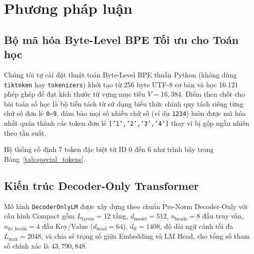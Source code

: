 \section{Phương pháp luận}

\subsection{Bộ mã hóa Byte-Level BPE Tối ưu cho Toán học}
Chúng tôi tự cài đặt thuật toán Byte-Level BPE thuần Python (không dùng \texttt{tiktoken} hay \texttt{tokenizers}) khởi tạo từ 256 byte UTF-8 cơ bản và học 16.121 phép ghép để đạt kích thước từ vựng mục tiêu $V = 16{,}384$. Điểm then chốt cho bài toán số học là bộ tiền tách từ sử dụng biểu thức chính quy tách riêng từng chữ số đơn lẻ \texttt{0--9}, đảm bảo mọi số nhiều chữ số (ví dụ \texttt{1234}) luôn được mã hóa nhất quán thành các token đơn lẻ \texttt{['1','2','3','4']} thay vì bị gộp ngẫu nhiên theo tần suất.

Hệ thống cố định 7 token đặc biệt từ ID 0 đến 6 như trình bày trong Bảng~\ref{tab:special_tokens}.

\begin{table}[htbp]
\centering
\caption{Danh sách 7 Token Đặc biệt Cố định}
\label{tab:special_tokens}
\end{table}

\subsection{Kiến trúc Decoder-Only Transformer}
Mô hình \texttt{DecoderOnlyLM} được xây dựng theo chuẩn Pre-Norm Decoder-Only \cite{touvron2023llama} với cấu hình Compact gồm $L_{\text{layers}} = 12$ tầng, $d_{\text{model}} = 512$, $n_{\text{heads}} = 8$ đầu truy vấn, $n_{\text{kv\_heads}} = 4$ đầu Key/Value ($d_{\text{head}} = 64$), $d_{\text{ff}} = 1408$, độ dài ngữ cảnh tối đa $L_{\max} = 2048$, và chia sẻ trọng số giữa Embedding và LM Head, cho tổng số tham số chính xác là $43{,}790{,}848$.

